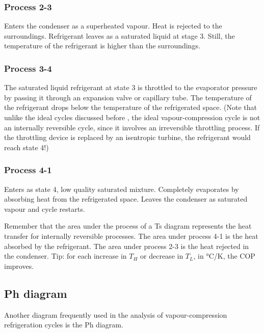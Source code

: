 \documentclass[class=report, crop=false, 12pt,a4paper]{standalone}
\begin{document}
\subsubsection{Process 2-3}
Enters the condenser as a superheated vapour. Heat is rejected to the surroundings. Refrigerant leaves as a saturated liquid at stage 3. Still, the temperature of the refrigerant is higher than the surroundings. 
\subsubsection{Process 3-4}
The saturated liquid refrigerant at state 3 is throttled to the evaporator pressure by passing it through an expansion valve or capillary tube. The temperature of the refrigerant drops below the temperature of the refrigerated space. (Note that unlike the ideal cycles discussed before , the ideal vapour-compression cycle is not an internally reversible cycle, since it involves an irreversible throttling process. If the throttling device is replaced by an isentropic turbine, the refrigerant would reach state 4!)
\subsubsection{Process 4-1}
Enters as state 4, low quality saturated mixture. Completely evaporates by absorbing heat from the refrigerated space. Leaves the condenser as saturated vapour and cycle restarts.

Remember that the area under the process of a Ts diagram represents the heat transfer for internally reversible processes. The area under process 4-1 is the heat absorbed by the refrigerant. The area under process 2-3 is the heat rejected in the condenser. Tip: for each increase in $T_H$ or decrease in $T_L$, in \si{\celsius}/\si{\kelvin}, the COP improves.
\subsection{Ph diagram}
Another diagram frequently used in the analysis of vapour-compression refrigeration cycles is the Ph diagram. 
\end{document}
